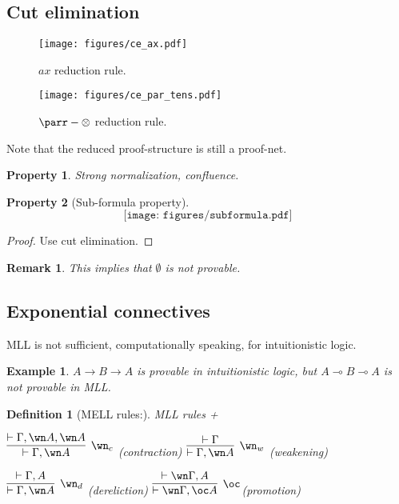 \documentclass[a4paper,10pt]{article}
\newtheorem{definition}{Definition}
\newtheorem{prop}{Property}
\newtheorem{ex}{Example}
\newtheorem{rmk}{Remark}
\begin{document}
\subsection{Cut elimination}
	\begin{figure}[h]
	\begin{center}
		\texttt{[image: figures/ce\_ax.pdf]}
		\caption{$ax$ reduction rule.}
		\texttt{[image: figures/ce\_par\_tens.pdf]}
		\caption{$\parr - \otimes$ reduction rule.}
		
	\end{center}
	\end{figure}	
	
	Note that the reduced proof-structure is still a proof-net.
	
	\begin{prop}
	Strong normalization, confluence.
	\end{prop}	
	
	\begin{prop}[Sub-formula property]
	$$\texttt{[image: figures/subformula.pdf]}$$
	\end{prop}	
	
	\begin{proof}
		Use cut elimination.
	\end{proof}
	
	\begin{rmk}
	This implies that $\emptyset$ is not provable.
	\end{rmk}
	
	
	\subsection{Exponential connectives}
	
	MLL is not sufficient, computationally speaking, for intuitionistic logic.
	
	\begin{ex}
		$A \rightarrow B \rightarrow A$ is provable in intuitionistic logic, but $A \multimap B \multimap A$ is not provable in MLL.
	\end{ex}	
	
	\begin{definition}[MELL rules:] MLL rules +
	
	$\infer[\wn_c]{\vdash \Gamma, \wn A}{\vdash \Gamma, \wn A, \wn A}$ (contraction) 
	$\infer[\wn_w]{\vdash \Gamma, \wn A}{\vdash \Gamma}$ (weakening)
	
	$\infer[\wn_d]{\vdash \Gamma, \wn A}{\vdash \Gamma, A}$ (dereliction)
	$\infer[\oc]{\vdash \wn\Gamma, \oc A}{\vdash \wn\Gamma, A}$(promotion)
	\end{definition}
	
\end{document}
